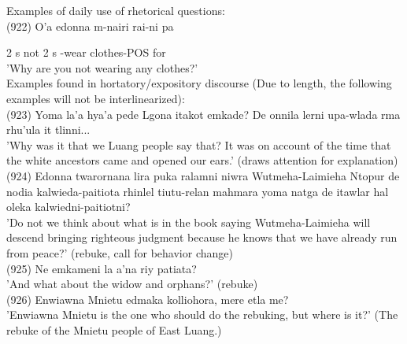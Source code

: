 \documentclass[10pt]{article}
\begin{document}
Examples of daily use of rhetorical questions:\\
(922) O'a edonna m-nairi rai-ni pa

2 s not 2 s -wear clothes-POS for\\
'Why are you not wearing any clothes?'\\
Examples found in hortatory/expository discourse (Due to length, the following examples will not be interlinearized):\\
(923) Yoma la'a hya'a pede Lgona itakot emkade? De onnila lerni upa-wlada rma rhu'ula it tlinni...\\
'Why was it that we Luang people say that? It was on account of the time that the white ancestors came and opened our ears.' (draws attention for explanation)\\
(924) Edonna twarornana lira puka ralamni niwra Wutmeha-Laimieha Ntopur de nodia kalwieda-paitiota rhinlel tiutu-relan mahmara yoma natga de itawlar hal oleka kalwiedni-paitiotni?\\
'Do not we think about what is in the book saying Wutmeha-Laimieha will descend bringing righteous judgment because he knows that we have already run from peace?' (rebuke, call for behavior change)\\
(925) Ne emkameni la a'na riy patiata?\\
'And what about the widow and orphans?' (rebuke)\\
(926) Enwiawna Mnietu edmaka kolliohora, mere etla me?\\
'Enwiawna Mnietu is the one who should do the rebuking, but where is it?' (The rebuke of the Mnietu people of East Luang.)
\end{document}
